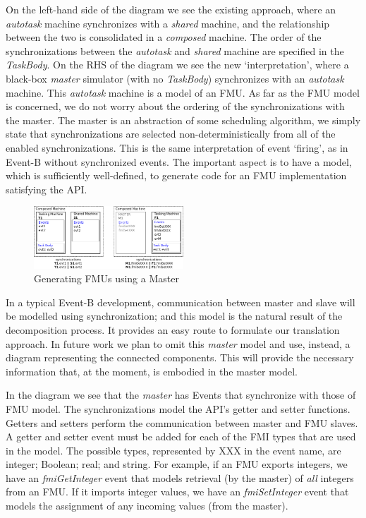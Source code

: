 \documentclass{llncs}%
\begin{document}
On the left-hand side of the diagram we see the existing approach, where an \emph{autotask} machine synchronizes with a \emph{shared} machine, and the relationship between the two is consolidated in a \emph{composed} machine. The order of the synchronizations between the \emph{autotask} and \emph{shared} machine are specified in the \emph{TaskBody}. On the RHS of the diagram we see the new `interpretation', where a black-box \emph{master} simulator (with no \emph{TaskBody}) synchronizes with an \emph{autotask} machine. This \emph{autotask} machine is a model of an FMU. As far as the FMU model is concerned, we do not worry about the ordering of the synchronizations with the master. The master is an abstraction of some scheduling algorithm, we simply state that synchronizations are selected non-deterministically from all of the enabled synchronizations. This is the same interpretation of event `firing', as in Event-B without synchronized events. The important aspect is to have a model, which is sufficiently well-defined, to generate code for an FMU implementation satisfying the API. 
%
\begin{figure}
\centering
\includegraphics[width = 0.5\textwidth]{FMUMachine.png}
\caption{Generating FMUs using a Master}
\label{fig:FMUMachine}
\end{figure}
%

In a typical Event-B development, communication between master and slave will be modelled using synchronization; and this model is the natural result of the decomposition process. It provides an easy route to formulate our translation approach. In future work we plan to omit this \emph{master} model and use, instead, a diagram representing the connected components. This will provide the necessary information that, at the moment, is embodied in the master model. 

In the diagram we see that the \emph{master} has Events that synchronize with those of  FMU model. The synchronizations model the API's getter and setter functions. Getters and setters perform the communication between master and FMU slaves. A getter and setter event must be added for each of the FMI types that are used in the model. The possible types, represented by XXX in the event name, are integer; Boolean; real; and string. For example, if an FMU exports integers, we have an \emph{fmiGetInteger} event that models retrieval (by the master) of \emph{all} integers from an FMU. If it imports integer values, we have an \emph{fmiSetInteger} event that models the assignment of any incoming values (from the master).  
\end{document}
